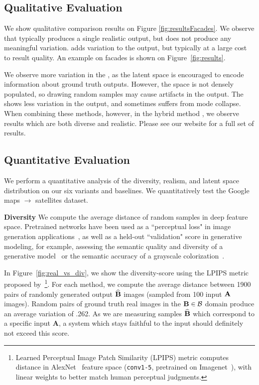 \subsection{Qualitative Evaluation}
\vspace{-1mm}
We show qualitative comparison results on Figure \ref{fig:resultsFacades}. We observe that \ppn typically produces a single realistic output, but does not produce any meaningful variation.
\cae adds variation to the output, but typically at a large cost to result quality. An example on facades is shown on Figure~\ref{fig:results}.

We observe more variation in the \cvaegan, as the latent space is encouraged to encode information about ground truth outputs. However, the space is not densely populated, so drawing random samples may cause artifacts in the output. The \cinfogan shows less variation in the output, and sometimes suffers from mode collapse. When combining these methods, however, in the hybrid method \bicycle, we observe results which are both diverse and realistic. Please see our website for a full set of results.

\vspace{-1mm}
\subsection{Quantitative Evaluation}
\vspace{-1mm}
We perform a quantitative analysis of the diversity, realism, and latent space distribution on our six variants and baselines. We quantitatively test the Google maps $\rightarrow$ satellites dataset.

{\bf Diversity} We compute the average distance of random samples in deep feature space. Pretrained networks have been used as a ``perceptual loss" in image generation applications~\citep{gatys2016image,johnson2016perceptual,dosovitskiy2016generating}, as well as a held-out ``validation" score in generative modeling, for example, assessing the semantic quality and diversity of a generative model~\citep{salimans2016improved} or the semantic accuracy of a grayscale colorization~\citep{zhang2016colorful}.

In Figure~\ref{fig:real_vs_div}, we show the diversity-score using the LPIPS metric proposed by~\cite{zhang2018unreasonable}\footnote{Learned Perceptual Image Patch Similarity (LPIPS) metric computes distance in AlexNet~\cite{krizhevsky2014one} feature space (\texttt{conv1-5}, pretrained on Imagenet~\citep{russakovsky2015imagenet}), with linear weights to better match human perceptual judgments.}. For each method, we compute the average distance between 1900 pairs of randomly generated output $\widehat{\mathbf{B}}$ images (sampled from 100 input $\mathbf{A}$ images). Random pairs of ground truth real images in the $\mathbf{B} \in \mathcal{B}$ domain produce an average variation of .262. As we are measuring samples $\widehat{\mathbf{B}}$ which correspond to a specific input $\mathbf{A}$, a system which stays faithful to the input should definitely not exceed this score.

